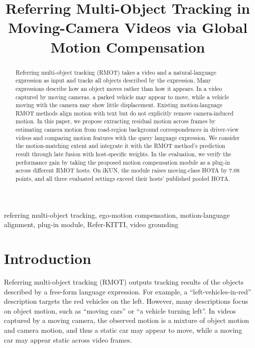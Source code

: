 \documentclass{article}
\title{Referring Multi-Object Tracking in Moving-Camera Videos via Global Motion Compensation}
\makeatletter
\providecommand{\DIFadd}[1]{{\protect\color{blue}\uwave{#1}}} %
\providecommand{\DIFdel}[1]{{\protect\color{red}\sout{#1}}} %
\providecommand{\DIFaddbegin}{} %
\providecommand{\DIFaddend}{} %
\providecommand{\DIFdelbegin}{} %
\providecommand{\DIFdelend}{} %
\providecommand{\DIFscaledelfig}{0.5}
\newlength{\DIFdelgraphicswidth} %
\newlength{\DIFdelgraphicsheight} %
\providecommand{\DIFaddincludegraphics}[2][]{{\color{blue}\fbox{\DIFOincludegraphics[#1]{#2}}}} %
\providecommand{\DIFdelincludegraphics}[2][]{%
\sbox{\DIFdelgraphicsbox}{\DIFOincludegraphics[#1]{#2}}%
\settoboxwidth{\DIFdelgraphicswidth}{\DIFdelgraphicsbox} %
\settoboxtotalheight{\DIFdelgraphicsheight}{\DIFdelgraphicsbox} %
\scalebox{\DIFscaledelfig}{%
\parbox[b]{\DIFdelgraphicswidth}{\usebox{\DIFdelgraphicsbox}\\[-\baselineskip] \rule{\DIFdelgraphicswidth}{0em}}\llap{\resizebox{\DIFdelgraphicswidth}{\DIFdelgraphicsheight}{%
\setlength{\unitlength}{\DIFdelgraphicswidth}%
\begin{picture}(1,1)%
\thicklines\linethickness{2pt} %
{\color[rgb]{1,0,0}\put(0,0){\framebox(1,1){}}}%
{\color[rgb]{1,0,0}\put(0,0){\line( 1,1){1}}}%
{\color[rgb]{1,0,0}\put(0,1){\line(1,-1){1}}}%
\end{picture}%
}\hspace*{3pt}}} %
} %
\DeclareRobustCommand{\DIFaddbegin}{\DIFOaddbegin \let\includegraphics\DIFaddincludegraphics} %
\DeclareRobustCommand{\DIFaddend}{\DIFOaddend \let\includegraphics\DIFOincludegraphics} %
\DeclareRobustCommand{\DIFdelbegin}{\DIFOdelbegin \let\includegraphics\DIFdelincludegraphics} %
\DeclareRobustCommand{\DIFdelend}{\DIFOaddend \let\includegraphics\DIFOincludegraphics} %
\let\sout@orig\sout %
\renewcommand{\sout}[1]{\ifmmode\text{\sout@orig{\ensuremath{#1}}}\else\sout@orig{#1}\fi} %
\makeatother
\begin{document}
\ninept
%
\maketitle
%
\begin{abstract}
  Referring multi-object tracking (RMOT) takes a video and a natural-language expression as input and tracks all objects described by the expression. Many expressions describe how an object moves rather than how it appears. In a video captured by moving cameras, a parked vehicle may appear to move, while a vehicle moving with the camera may show little displacement. Existing motion-language RMOT methods align motion with text but do not explicitly remove camera-induced motion. In this paper, we propose extracting residual motion across frames by estimating camera motion from road-region background correspondences in driver-view videos and comparing motion features with the query language expression. We consider the motion-matching extent and integrate it with the RMOT method's prediction result through late fusion with host-specific weights. In the evaluation, we verify the performance gain by taking the proposed motion compensation module as a plug-in across different RMOT hosts. On iKUN, the module raises moving-class HOTA by \DIFdelbegin \DIFdel{$7.08$ }\DIFdelend \DIFaddbegin \DIFadd{$9.44$ }\DIFaddend points, and all three evaluated settings exceed their hosts' published pooled HOTA.
\end{abstract}
%
\begin{keywords}
  referring multi-object tracking, ego-motion compensation, motion-language alignment, plug-in module, Refer-KITTI, video grounding
\end{keywords}


\section{Introduction}
\label{sec:intro}
Referring multi-object tracking (RMOT) outputs tracking results of the objects described by a free-form language expression. For example, a \enquote{left-vehicles-in-red} description targets the red vehicles on the left. However, many descriptions focus on object motion, such as \enquote{moving cars} or \enquote{a vehicle turning left}. In videos captured by a moving camera, the observed motion is a mixture of object motion and camera motion, and thus a static car may appear to move, while a moving car may appear static across video frames.
\end{document}
